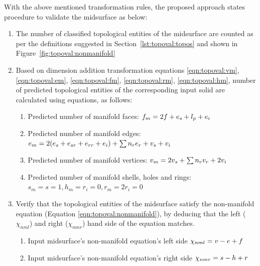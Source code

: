 With the above mentioned transformation rules, the proposed approach states procedure to validate the midsurface as below:

\begin{enumerate}
\item The number of classified topological entities of the midsurface are counted as per the definitions suggested in Section~\ref{lst:topoval:topos} and shown in Figure~\ref{fig:topoval:nonmanifold}%
\item Based on dimension addition transformation equations \ref{eqn:topoval:vm}, \ref{eqn:topoval:em}, \ref{eqn:topoval:fm}, \ref{eqn:topoval:rm}, \ref{eqn:topoval:hm}, number of predicted topological entities of the corresponding input solid are calculated using equations, as follows:
	\begin{enumerate}
		\item Predicted number of manifold faces: $f_m \newline = 2f+e_s+ l_p +e_i $
		\item Predicted number of manifold edges: $e_m \newline = 2(e_s+e_{sr}+e_{rr}+e_i )+ \sum n_{r} e_{r}+v_s+v_i $
		\item Predicted number of manifold vertices: $v_m \newline= 2v_s+ \sum n_{r} v_r+2v_i$
		\item Predicted number of manifold shells, holes and rings: \newline$s_m =s = 1, h_m = r_i  = 0, r_m = 2r_i = 0$
	\end{enumerate}
\item Verify that the topological entities of the midsurface satisfy the non-manifold equation (Equation \ref{eqn:topoval:nonmanifold}), by deducing that the left ($\chi_{nml}$) and right  ($\chi_{nmr}$) hand side of the equation matches.
	\begin{enumerate}
		\item Input midsurface's non-manifold equation's left side  $\chi_{nml} \newline= v-e+f $
		\item Input midsurface's non-manifold equation's  right side  $\chi_{nmr} \newline=s-h+r$

\end{enumerate}
\end{enumerate}
